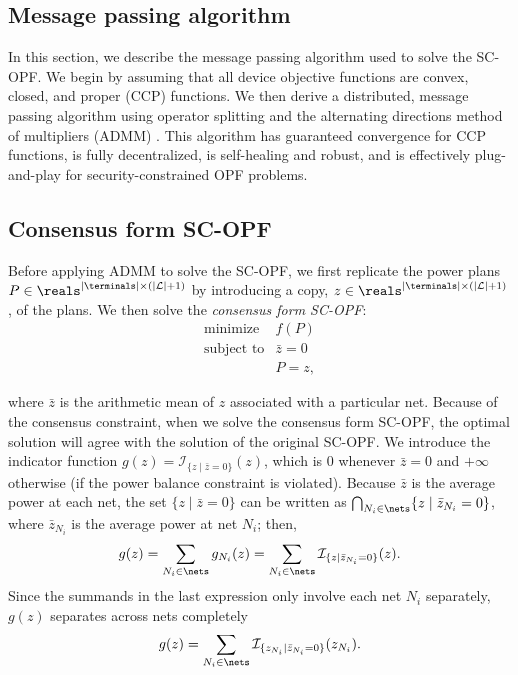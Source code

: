 \subsection{Message passing algorithm}

In this section, we describe the message passing algorithm used to solve
the SC-OPF. We begin by assuming that all device objective functions are
convex, closed, and proper (CCP) functions. We then derive a
distributed, message passing algorithm using operator splitting and the
alternating directions method of multipliers (ADMM) \cite{BP:11}. This
algorithm has guaranteed convergence for CCP functions, is fully
decentralized, is self-healing and robust, and is effectively
plug-and-play for security-constrained OPF problems.

\subsection{Consensus form SC-OPF}
Before applying ADMM to solve the SC-OPF, we first replicate the power
plans $P \in \reals^{|\terminals| \times (|\mathcal{L}|+1)}$ by introducing a copy,
$z \in \reals^{|\terminals| \times (|\mathcal{L}|+1)}$, of the plans. We then solve
the \emph{consensus form SC-OPF}:
\begin{equation}
\begin{array}{ll}
\mbox{minimize} & f(P) \\
\mbox{subject to} & \bar z = 0 \\
& P = z,
\end{array}
\end{equation} \label{p-consensus-scopf}

where $\bar z$ is the arithmetic mean of $z$ associated with a particular net. Because of the consensus constraint, when we solve the consensus form
SC-OPF, the optimal solution will agree with the solution of the
original SC-OPF. We introduce the indicator function $g(z) =
\mathcal{I}_{ \{ z \mid \bar z = 0 \}}(z)$, which is $0$ whenever $\bar
z = 0$ and $+\infty$ otherwise (if the power balance constraint is
violated). Because $\bar z$ is the average power at each net, the set
$\{ z \mid \bar z = 0 \}$ can be written as $\bigcap_{N_i \in \nets} \{ z
\mid \bar z_{N_i} = 0 \}$, where $\bar z_{N_i}$ is the average power at net $N_i$;
then,
\[
g(z) = \sum_{{N_i} \in \nets} g_{N_i}(z) = \sum_{{N_i} \in \nets} \mathcal{I}_{\{ z \mid \bar z_{N_i} = 0 \}}(z).
\]
Since the summands in the last expression only involve each net ${N_i}$
separately, $g(z)$ separates across nets completely
\[
g(z) = \sum_{{N_i} \in \nets} \mathcal{I}_{\{z_{N_i} \mid \bar z_{N_i} = 0\}} (z_{N_i}).
\]

